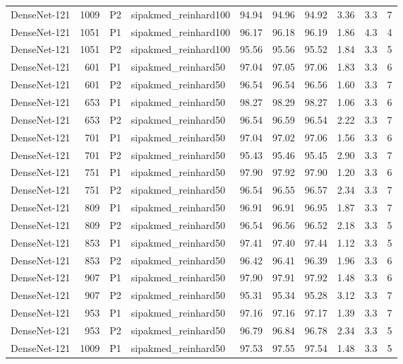{\begin{longtable}{lrllrrrrrr}
DenseNet-121 & 1009 & P2 & sipakmed\_reinhard100 & 94.94 & 94.96 & 94.92 & 3.36 & 3.3 & 7 \\
DenseNet-121 & 1051 & P1 & sipakmed\_reinhard100 & 96.17 & 96.18 & 96.19 & 1.86 & 4.3 & 4 \\
DenseNet-121 & 1051 & P2 & sipakmed\_reinhard100 & 95.56 & 95.56 & 95.52 & 1.84 & 3.3 & 5 \\
DenseNet-121 & 601 & P1 & sipakmed\_reinhard50 & 97.04 & 97.05 & 97.06 & 1.83 & 3.3 & 6 \\
DenseNet-121 & 601 & P2 & sipakmed\_reinhard50 & 96.54 & 96.54 & 96.56 & 1.60 & 3.3 & 7 \\
DenseNet-121 & 653 & P1 & sipakmed\_reinhard50 & 98.27 & 98.29 & 98.27 & 1.06 & 3.3 & 6 \\
DenseNet-121 & 653 & P2 & sipakmed\_reinhard50 & 96.54 & 96.59 & 96.54 & 2.22 & 3.3 & 7 \\
DenseNet-121 & 701 & P1 & sipakmed\_reinhard50 & 97.04 & 97.02 & 97.06 & 1.56 & 3.3 & 6 \\
DenseNet-121 & 701 & P2 & sipakmed\_reinhard50 & 95.43 & 95.46 & 95.45 & 2.90 & 3.3 & 7 \\
DenseNet-121 & 751 & P1 & sipakmed\_reinhard50 & 97.90 & 97.92 & 97.90 & 1.20 & 3.3 & 6 \\
DenseNet-121 & 751 & P2 & sipakmed\_reinhard50 & 96.54 & 96.55 & 96.57 & 2.34 & 3.3 & 7 \\
DenseNet-121 & 809 & P1 & sipakmed\_reinhard50 & 96.91 & 96.91 & 96.95 & 1.87 & 3.3 & 7 \\
DenseNet-121 & 809 & P2 & sipakmed\_reinhard50 & 96.54 & 96.56 & 96.52 & 2.18 & 3.3 & 5 \\
DenseNet-121 & 853 & P1 & sipakmed\_reinhard50 & 97.41 & 97.40 & 97.44 & 1.12 & 3.3 & 5 \\
DenseNet-121 & 853 & P2 & sipakmed\_reinhard50 & 96.42 & 96.41 & 96.39 & 1.96 & 3.3 & 6 \\
DenseNet-121 & 907 & P1 & sipakmed\_reinhard50 & 97.90 & 97.91 & 97.92 & 1.48 & 3.3 & 6 \\
DenseNet-121 & 907 & P2 & sipakmed\_reinhard50 & 95.31 & 95.34 & 95.28 & 3.12 & 3.3 & 7 \\
DenseNet-121 & 953 & P1 & sipakmed\_reinhard50 & 97.16 & 97.16 & 97.17 & 1.39 & 3.3 & 7 \\
DenseNet-121 & 953 & P2 & sipakmed\_reinhard50 & 96.79 & 96.84 & 96.78 & 2.34 & 3.3 & 5 \\
DenseNet-121 & 1009 & P1 & sipakmed\_reinhard50 & 97.53 & 97.55 & 97.54 & 1.48 & 3.3 & 5 \\

\end{longtable}}
